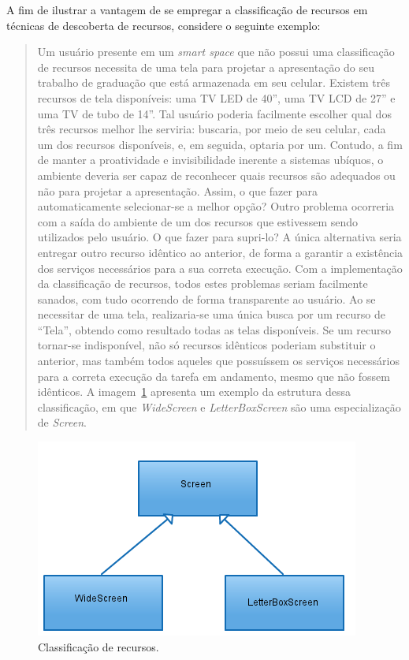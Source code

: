 A fim de ilustrar a vantagem de se empregar a classificação de recursos em técnicas de descoberta de recursos, considere o seguinte exemplo:

\begin{quote}
	Um usuário presente em um \emph{smart space} que não possui uma classificação de recursos necessita de uma tela para projetar a apresentação do seu trabalho de graduação que está armazenada em seu celular. Existem três recursos de tela disponíveis: uma TV LED de 40'', uma TV LCD de 27'' e uma TV de tubo de 14''. Tal usuário poderia facilmente escolher qual dos três recursos melhor lhe serviria: buscaria, por meio de seu celular, cada um dos recursos disponíveis, e, em seguida, optaria por um. Contudo, a fim de manter a proatividade e invisibilidade inerente a sistemas ubíquos, o ambiente deveria ser capaz de reconhecer quais recursos são adequados ou não para projetar a apresentação. Assim, o que fazer para automaticamente selecionar-se a melhor opção? Outro problema ocorreria com a saída do ambiente de um dos recursos que estivessem sendo utilizados pelo usuário. O que fazer para supri-lo? A única alternativa seria entregar outro recurso idêntico ao anterior, de forma a garantir a existência dos serviços necessários para a sua correta execução. Com a implementação da classificação de recursos, todos estes problemas seriam facilmente sanados, com tudo ocorrendo de forma transparente ao usuário. Ao se necessitar de uma tela, realizaria-se uma única busca por um recurso de ``Tela'', obtendo como resultado todas as telas disponíveis. Se um recurso tornar-se indisponível, não só recursos idênticos poderiam substituir o anterior, mas também todos aqueles que possuíssem os serviços necessários para a correta execução da tarefa em andamento, mesmo que não fossem idênticos. A imagem~\ref{fig:arvoreDeEquivalencia} apresenta um exemplo da estrutura dessa classificação, em que \emph{WideScreen} e \emph{LetterBoxScreen} são uma especialização de \emph{Screen}.
\end{quote}

\begin{figure}[ht]
	\center
	\includegraphics[scale=0.8]{imagens/screenTree}
	\caption{Classificação de recursos.}
	\label{fig:arvoreDeEquivalencia}
\end{figure}

